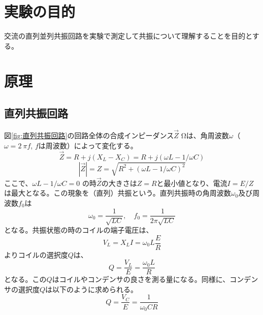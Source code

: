 \documentclass[12pt,a4paper]{jsarticle}
\numberwithin{equation}{section}
\numberwithin{figure}{section}
\numberwithin{table}{section}
\begin{document}
  \section{実験の目的}
  交流の直列並列共振回路を実験で測定して共振について理解することを目的とする。

  \section{原理}
  \subsection{直列共振回路}
  図\ref{fig:直列共振回路}の回路全体の合成インピーダンス$\vec{Z}$ $\si{\ohm}$は、角周波数$\omega$（$\omega = \SI{2}{\pi}$$f$, $f$は周波数）によって変化する。
  \begin{equation}
    \vec{Z}=R+j(X_L-X_C)=R+j(\omega L - 1/\omega C)
  \end{equation}
  \begin{equation}
    |\vec{Z}|=Z=\sqrt{R^{2}+(\omega L - 1/\omega C)^{2}}
  \end{equation}
  ここで、$\omega L - 1/\omega C=0$ の時$\vec{Z}$の大きさは$Z=R$と最小値となり、電流$I=E/Z$は最大となる。この現象を（直列）共振という。直列共振時の角周波数$\omega_0$及び周波数$f_0$は
  \begin{equation}
    \omega_0=\dfrac{1}{\sqrt{LC}},\quad f_0=\dfrac{1}{2\pi\sqrt{LC}}
  \end{equation}
  となる。共振状態の時のコイルの端子電圧は、
  \begin{equation}
    V_L=X_{L}I=\omega_{0}L\dfrac{E}{R}
  \end{equation}
  よりコイルの選択度$Q$は、
  \begin{equation}
    Q=\dfrac{V_L}{E}=\dfrac{\omega_{0}L}{R}
  \end{equation}
  となる。この$Q$はコイルやコンデンサの良さを測る量になる。同様に、コンデンサの選択度$Q$は以下のように求められる。
  \begin{equation}
    Q=\dfrac{V_C}{E}=\dfrac{1}{\omega_0CR}
  \end{equation}
\end{document}
